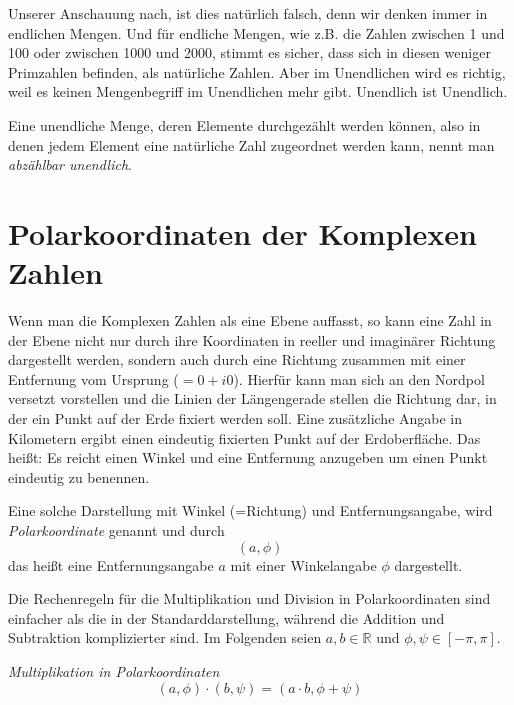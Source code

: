 Unserer Anschauung nach, ist dies natürlich falsch, denn wir denken immer in endlichen Mengen. Und für endliche Mengen, wie z.B. die Zahlen zwischen 1 und 100 oder zwischen 1000 und 2000, stimmt es sicher, dass sich in diesen weniger Primzahlen befinden, als natürliche Zahlen. Aber im Unendlichen wird es richtig, weil es keinen Mengenbegriff im Unendlichen mehr gibt. Unendlich ist Unendlich.

\begin{definition}
Eine unendliche Menge, deren Elemente durchgezählt werden können, also in denen jedem Element eine natürliche Zahl zugeordnet werden kann, nennt man \textsl{abzählbar unendlich}.\label{abzaehlbar}  
\end{definition}

\section{Polarkoordinaten der Komplexen Zahlen}

Wenn man die Komplexen Zahlen als eine Ebene auffasst, so kann eine Zahl in der Ebene nicht nur durch ihre Koordinaten in reeller und imaginärer Richtung dargestellt werden, sondern auch durch eine Richtung zusammen mit einer Entfernung vom Ursprung ($=0+i0$). Hierfür kann man sich an den Nordpol versetzt vorstellen und die Linien der Längengerade stellen die Richtung dar, in der ein Punkt auf der Erde fixiert werden soll. Eine zusätzliche Angabe in Kilometern ergibt einen eindeutig fixierten Punkt auf der Erdoberfläche. Das heißt: Es reicht einen Winkel und eine Entfernung anzugeben um einen Punkt eindeutig zu benennen. 

\begin{definition}
Eine solche Darstellung mit Winkel (=Richtung) und Entfernungsangabe, wird \textsl{Polarkoordinate} genannt und durch 
\[(a,\phi)\]
das heißt eine Entfernungsangabe $a$ mit einer Winkelangabe $\phi$ dargestellt.
\end{definition}

Die Rechenregeln für die Multiplikation und Division in Polarkoordinaten sind einfacher als die in der Standarddarstellung, während die Addition und Subtraktion komplizierter sind. Im Folgenden seien $a,b \in \mathbb{R}$ und $\phi,\psi \in \left[-\pi, \pi\right]$.

\begin{definition} \textsl{Multiplikation in Polarkoordinaten}
\[
(a,\phi) \cdot (b,\psi) = (a\cdot b, \phi+\psi)
\]
\end{definition}

